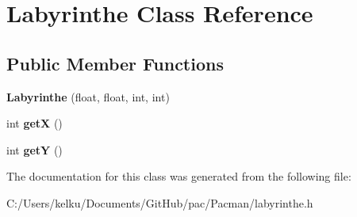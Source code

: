 \hypertarget{class_labyrinthe}{}\section{Labyrinthe Class Reference}
\label{class_labyrinthe}
\subsection*{Public Member Functions}
\begin{DoxyCompactItemize}
\item 
\hypertarget{class_labyrinthe_a5ee4a2803de1dca1116c7e6c8f08b5d0}{}{\bfseries Labyrinthe} (float, float, int, int)\label{class_labyrinthe_a5ee4a2803de1dca1116c7e6c8f08b5d0}

\item 
\hypertarget{class_labyrinthe_aade17610e33994e5e021684915529db4}{}int {\bfseries get\+X} ()\label{class_labyrinthe_aade17610e33994e5e021684915529db4}

\item 
\hypertarget{class_labyrinthe_af78626c211db2bdb5b63ad6970051d4f}{}int {\bfseries get\+Y} ()\label{class_labyrinthe_af78626c211db2bdb5b63ad6970051d4f}

\end{DoxyCompactItemize}


The documentation for this class was generated from the following file\+:\begin{DoxyCompactItemize}
\item 
C\+:/\+Users/kelku/\+Documents/\+Git\+Hub/pac/\+Pacman/labyrinthe.\+h\end{DoxyCompactItemize}
